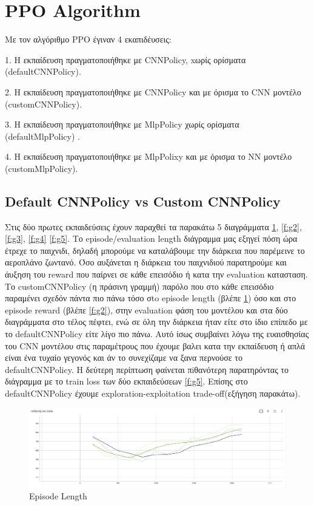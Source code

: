 \section{PPO Algorithm}
Με τον αλγόριθμο PPO έγιναν 4 εκαπιδέυσεις:

1. Η εκπαίδευση πραγματοποιήθηκε με CNNPolicy, xωρίς ορίσματα (defaultCNNPolicy).

2. Η εκπαίδευση πραγματοποιήθηκε με CNNPolicy και με όρισμα το CNN μοντέλο (customCNNPolicy).

3. Η εκπαίδευση πραγματοποιήθηκε με MlpPolicy χωρίς ορίσματα (defaultMlpPolicy) .

4. Η εκπαίδευση πραγματοποιήθηκε με MlpPolixy και με όρισμα το NN μοντέλο (customMlpPolicy).


\subsection{Default CNNPolicy vs Custom CNNPolicy}

Στις δύο πρωτες εκπαιδεύσεις έχουν παραχθεί τα παρακάτω 5 διαγράμματα \ref{f:g1}, \ref{f:g2}, \ref{f:g3}, \ref{f:g4} \ref{f:g5}. Το episode/evaluation length διάγραμμα μας εξηγεί πόση ώρα έτρεχε το παιχνιδι, δηλαδή  μπορούμε να καταλάβουμε την διάρκεια που παρέμεινε το αεροπλάνο ζωντανό. Όσο αυξάνεται η διάρκεια του παιχνιδιού παρατηρούμε και άυξηση του reward που παίρνει σε κάθε επεισόδιο ή κατα την evaluation κατασταση.
Tο customCNNPolicy (η πράσινη γραμμή) παρόλο που στο κάθε επεισόδιο παραμένει σχεδόν πάντα πιο πάνω τόσο σto episode length (βλέπε \ref{f:g1}) όσο και στο episode reward (βλέπε \ref{f:g2}), στην evaluation φάση του μοντέλου και στα δύο διαγράμματα στο τέλος πέφτει, ενώ σε όλη την διάρκεια ήταν είτε στο ίδιο επίπεδο με το defaultCNNPolicy είτε λίγο πιο πάνω. Αυτό ίσως συμβαίνει λόγω της ευαισθησίας του CNN μοντέλου στις παραμέτρους που έχουμε βαλει κατα την εκπαίδευση ή απλά είναι ένα τυχαίο γεγονός και άν το συνεχίζαμε να ξανα περνούσε το defaultCNNPolicy. Η δεύτερη περίπτωση φαίνεται πiθανότερη παρατηρόντας το διάγραμμα με το train loss των δύο εκπαιδεύσεων \ref{f:g5}.
Επίσης στο defaultCNNPolicy έχουμε exploration-exploitation trade-off(εξήγηση παρακάτω).




\begin{figure}[ht]
	\centering
	\includegraphics[width=1\linewidth]{Results/PPO_CNN/ep_length.png}
	\caption{ Episode Length}
	\label{f:g1}	
\end{figure}


